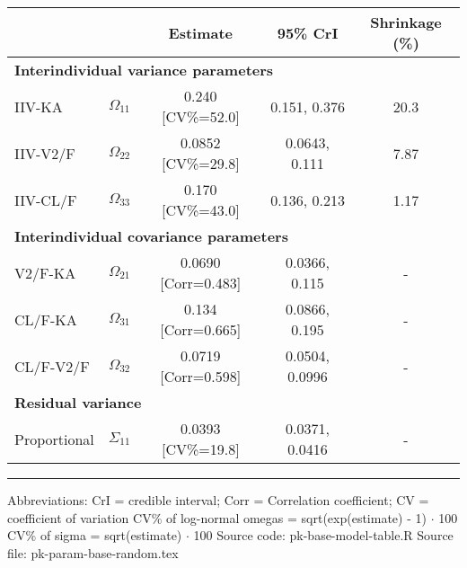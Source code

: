 \setlength{\tabcolsep}{5pt} 
\begin{threeparttable}
\renewcommand{\arraystretch}{1.3}
\begin{tabular}[h]{lcccc}
\hline
 &  & Estimate & 95\% CrI & Shrinkage (\%) \\
\hline
\multicolumn{5}{l}{\textbf{Interindividual variance parameters}}\\%
IIV-KA & $\Omega_{11}$ & 0.240 [CV\%=52.0] & 0.151, 0.376 & 20.3 \\
IIV-V2/F & $\Omega_{22}$ & 0.0852 [CV\%=29.8] & 0.0643, 0.111 & 7.87 \\
IIV-CL/F & $\Omega_{33}$ & 0.170 [CV\%=43.0] & 0.136, 0.213 & 1.17 \\
\hline \multicolumn{5}{l}{\textbf{Interindividual covariance parameters}}\\%
V2/F-KA & $\Omega_{21}$ & 0.0690 [Corr=0.483] & 0.0366, 0.115 & - \\
CL/F-KA & $\Omega_{31}$ & 0.134 [Corr=0.665] & 0.0866, 0.195 & - \\
CL/F-V2/F & $\Omega_{32}$ & 0.0719 [Corr=0.598] & 0.0504, 0.0996 & - \\
\hline \multicolumn{5}{l}{\textbf{Residual variance}}\\%
Proportional & $\Sigma_{11}$ & 0.0393 [CV\%=19.8] & 0.0371, 0.0416 & - \\
\hline
\end{tabular}
\end{threeparttable}
 
\vspace{0.67cm}
 
\begin{minipage}{1\linewidth}
\linespread{1.1}\selectfont
\rule{1\linewidth}{0.4pt}
\vspace{0.02cm}
Abbreviations: CrI = credible interval; 
                        Corr = Correlation coefficient;
                        CV = coefficient of variation \newline
CV\% of log-normal omegas = sqrt(exp(estimate) - 1) $\cdot$ 100 \newline
CV\% of sigma = sqrt(estimate) $\cdot$ 100 \newline
Source code: pk-base-model-table.R \newline
Source file: pk-param-base-random.tex \newline
\end{minipage}
